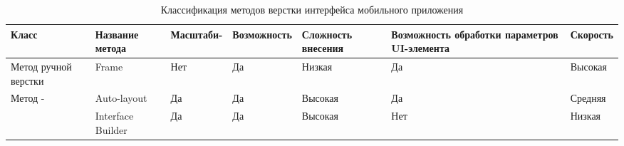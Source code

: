 \begin{landscape}

\begin{table}[H]
	\centering
	\caption{Классификация методов верстки интерфейса мобильного приложения}
	\label{result3}
		\begin{tabular}{|p{3.3cm}|p{3.3cm}|p{3.5cm}|p{3.5cm}|p{3.5cm}|p{3.5cm}|p{3.2cm}|}
			\hline
			\textbf{Класс } & \textbf{Название метода} & \textbf{Масштаби-  } & 
			\textbf{Возможность  } & \textbf{Сложность внесения } & 
			\textbf{Возможность обработки параметров \linebreak UI-элемента} & \textbf{Скорость   } \\
			\hline
			{Метод ручной верстки} & 
			Frame & 
			Нет & Да & Низкая & Да & Высокая \\
			\hline
			\multirow{2}{2.9cm}{Метод - } 
			& Auto-\linebreak layout 
			& Да & Да & Высокая & Да & Средняя \\
			\cline{2-7} & Interface Builder 
			& Да & Да & Высокая & Нет & Низкая \\
			\hline
		\end{tabular}
\end{table}
\end{landscape}
